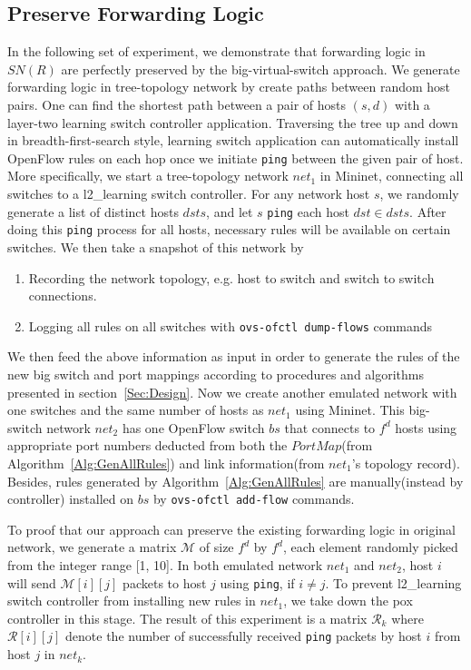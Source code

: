 \subsection{Preserve Forwarding Logic}
\label{SubSec:PreserveForwardingLogic}
In the following set of experiment, we demonstrate that forwarding logic in $SN(R)$ are
perfectly preserved by the big-virtual-switch approach.
We generate forwarding logic in tree-topology network by create paths between random host pairs.
One can find the shortest path between a pair of hosts $(s, d)$ with
a layer-two learning switch controller application.
Traversing the tree up and down in breadth-first-search style, learning switch application
can automatically install OpenFlow rules on each hop once we initiate \texttt{ping} between
the given pair of host.
More specifically, we start a tree-topology network $net_1$ in Mininet\cite{Mininet},
connecting all switches to a l2\_learning switch controller\cite{Pox}.
For any network host $s$, we randomly generate a list of distinct hosts $dsts$,
and let $s$ \texttt{ping} each host $dst \in dsts$.
After doing this \texttt{ping} process for all hosts, necessary rules will be available on
certain switches.
We then take a snapshot of this network by
\begin{enumerate}
\item Recording the network topology, e.g. host to switch and switch to switch connections.
\item Logging all rules on all switches with \texttt{ovs-ofctl dump-flows} commands
\end{enumerate}
We then feed the above information as input in order to generate the rules of the new big switch
and port mappings according to procedures and algorithms presented in section~\ref{Sec:Design}.
Now we create another emulated network with one switches and
the same number of hosts as $net_1$ using Mininet.
This big-switch network $net_2$ has one OpenFlow switch $bs$ that connects to $f^d$ hosts using
appropriate port numbers deducted from both the $PortMap$(from Algorithm~\ref{Alg:GenAllRules})
and link information(from $net_1$'s topology record).
Besides, rules generated by Algorithm~\ref{Alg:GenAllRules} are manually(instead by controller)
installed on $bs$ by \texttt{ovs-ofctl add-flow} commands.

To proof that our approach can preserve the existing forwarding logic in original network,
we generate a matrix $\mathcal{M}$ of size $f^d$ by $f^d$, each element randomly picked
from the integer range [1, 10].
In both emulated network $net_1$ and $net_2$, host $i$ will send $\mathcal{M}[i][j]$
packets to host $j$ using \texttt{ping}, if $i \neq j$.
To prevent l2\_learning switch controller from installing new rules in $net_1$, we take down
the pox controller in this stage.
The result of this experiment is a matrix $\mathcal{R}_k$ where $\mathcal{R}[i][j]$ denote
the number of successfully received \texttt{ping} packets by host $i$ from host $j$ in $net_k$.

